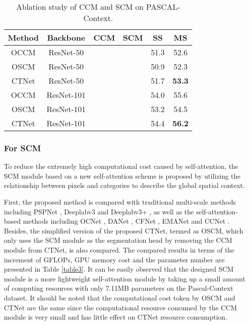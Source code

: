 \documentclass[10pt,journal,cspaper,compsoc]{IEEEtran}
\begin{document}
\begin{table}[t]
\caption{Ablation study of CCM and SCM on PASCAL-Context.}
	\label{table5}
		\renewcommand\arraystretch{1.3}
		\centering
		\begin{tabular}{c|c|c|c|c|c}
			\hline
			Method & Backbone &CCM & SCM&SS &MS\\
			\hline
			OCCM&ResNet-50  & & &51.3 &52.6\\
			OSCM&ResNet-50& & & 50.9&52.3\\
			CTNet&ResNet-50& &&51.7&\textbf{53.3}\\
			\hline
			OCCM&ResNet-101  & & &54.0 & 55.6\\
			OSCM&ResNet-101& & & 53.2 & 54.5\\
			CTNet&ResNet-101& &&54.4&\textbf{56.2}\\
			\hline
	\end{tabular}
\end{table}
	
\subsubsection{For SCM}
To reduce the extremely high computational cost caused by self-attention, the SCM module based on a new self-attention scheme is proposed by utilizing the relationship between pixels and categories to describe the global spatial context.
	
First, the proposed method is compared with traditional multi-scale methods including PSPNet \cite{zhao2017pyramid}, Deeplabv3 \cite{chen2017rethinking} and Deeplabv3+ \cite{chen2018encoder}, as well as the self-attention-based methods including OCNet \cite{yu2020context}, DANet \cite{fu2019dual}, CFNet \cite{zhang2019co}, EMANet \cite{li2019expectation} and CCNet \cite{huang2019ccnet}. Besides, the simplified version of the proposed CTNet, termed as OSCM, which only uses the SCM module as the segmentation head by removing the CCM module from CTNet, is also compared. The compared results in terms of the increment of GFLOPs, GPU memory cost and the parameter number are presented in Table \ref{table3}. It can be easily observed that the designed SCM module is a more lightweight self-attention module by taking up a small amount of computing resources with only 7.11MB parameters on the Pascal-Context dataset. It should be noted that the computational cost token by OSCM and CTNet are the same since the computational resource consumed by the CCM module is very small and has little effect on CTNet resource consumption.
	
\end{document}
